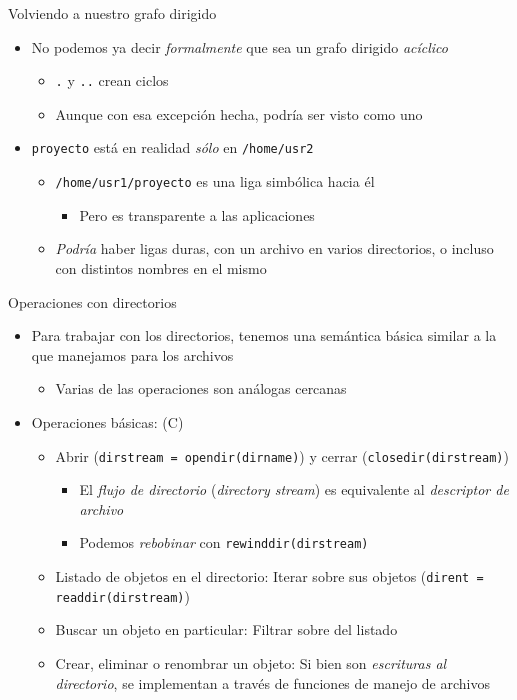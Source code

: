\documentclass[presentation]{beamer}
\begin{document}
\begin{frame}[label={sec:org387dbd3},fragile]{Volviendo a nuestro grafo dirigido}
 \begin{itemize}
\item No podemos ya decir \emph{formalmente} que sea un grafo dirigido
\emph{acíclico}
\begin{itemize}
\item \texttt{.} y \texttt{..} crean ciclos
\item Aunque con esa excepción hecha, podría ser visto como uno
\end{itemize}
\item \texttt{proyecto} está en realidad \emph{sólo} en \texttt{/home/usr2}
\begin{itemize}
\item \texttt{/home/usr1/proyecto} es una liga simbólica hacia él
\begin{itemize}
\item Pero es transparente a las aplicaciones
\end{itemize}
\item \emph{Podría} haber ligas duras, con un archivo en varios directorios,
o incluso con distintos nombres en el mismo
\end{itemize}
\end{itemize}
\end{frame}

\begin{frame}[label={sec:org08a02f7},fragile]{Operaciones con directorios}
 \begin{itemize}
\item Para trabajar con los directorios, tenemos una semántica básica
similar a la que manejamos para los archivos
\begin{itemize}
\item Varias de las operaciones son análogas cercanas
\end{itemize}
\item Operaciones básicas: (C)
\begin{itemize}
\item Abrir (\texttt{dirstream = opendir(dirname)}) y cerrar
(\texttt{closedir(dirstream)})
\begin{itemize}
\item El \emph{flujo de directorio} (\emph{directory stream}) es equivalente al
\emph{descriptor de archivo}
\item Podemos \emph{rebobinar} con \texttt{rewinddir(dirstream)}
\end{itemize}
\item Listado de objetos en el directorio: Iterar sobre sus objetos
(\texttt{dirent = readdir(dirstream)})
\item Buscar un objeto en particular: Filtrar sobre del listado
\item Crear, eliminar o renombrar un objeto: Si bien son \emph{escrituras al
directorio}, se implementan a través de funciones de manejo de
archivos
\end{itemize}
\end{itemize}
\end{frame}
\end{document}
